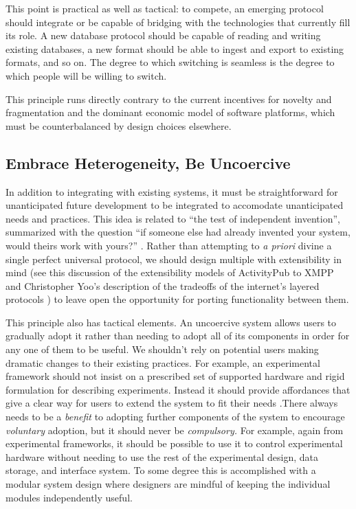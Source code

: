 This point is practical as well as tactical: to compete, an emerging
protocol should integrate or be capable of bridging with the
technologies that currently fill its role. A new database protocol
should be capable of reading and writing existing databases, a new
format should be able to ingest and export to existing formats, and so
on. The degree to which switching is seamless is the degree to which
people will be willing to switch.

This principle runs directly contrary to the current incentives for
novelty and fragmentation and the dominant economic model of software
platforms, which must be counterbalanced by design choices elsewhere.

\hypertarget{embrace-heterogeneity-be-uncoercive}{%
\subsection{Embrace Heterogeneity, Be
Uncoercive}\label{embrace-heterogeneity-be-uncoercive}}

In addition to integrating with existing systems, it must be
straightforward for unanticipated future development to be integrated to
accomodate unanticipated needs and practices. This idea is related to
``the test of independent invention'', summarized with the question ``if
someone else had already invented your system, would theirs work with
yours?'' \citep{berners-leePrinciplesDesign1998} . Rather than
attempting to \emph{a priori} divine a single perfect universal
protocol, we should design multiple with extensibility in mind (see this
discussion of the extensibility models of ActivityPub to XMPP \citep{schubertActivityPubFinalThoughts2019}  and Christopher Yoo's
description of the tradeoffs of the internet's layered protocols \citep{yooProtocolLayeringInternet2013} ) to leave open the opportunity
for porting functionality between them.

This principle also has tactical elements. An uncoercive system allows
users to gradually adopt it rather than needing to adopt all of its
components in order for any one of them to be useful. We shouldn't rely
on potential users making dramatic changes to their existing practices.
For example, an experimental framework should not insist on a prescribed
set of supported hardware and rigid formulation for describing
experiments. Instead it should provide affordances that give a clear way
for users to extend the system to fit their needs \citep{carpenterRFC1958Architectural1996} .There always needs to be a
\emph{benefit} to adopting further components of the system to encourage
\emph{voluntary} adoption, but it should never be \emph{compulsory.} For
example, again from experimental frameworks, it should be possible to
use it to control experimental hardware without needing to use the rest
of the experimental design, data storage, and interface system. To some
degree this is accomplished with a modular system design where designers
are mindful of keeping the individual modules independently useful.

